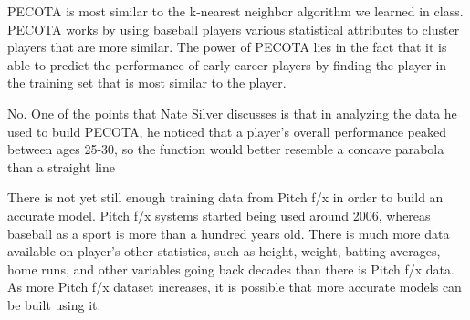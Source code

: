 \documentclass[12pt]{article}
\begin{document}

\begin{enumerate}


PECOTA is most similar to the k-nearest neighbor algorithm we learned in class. PECOTA works by using baseball players various statistical attributes to cluster players that are more similar. The power of PECOTA lies in the fact that it is able to predict the performance of early career players by finding the player in the training set that is most similar to the player.


No. One of the points that Nate Silver discusses is that in analyzing the data he used to build PECOTA, he noticed that a player's overall performance peaked between ages 25-30, so the function would better resemble a concave parabola than a straight line





There is not yet still enough training data from Pitch f/x in order to build an accurate model. Pitch f/x systems started being used around 2006, whereas baseball as a sport is more than a hundred years old. There is much more data available on player's other statistics, such as height, weight, batting averages, home runs, and other variables going back decades than there is Pitch f/x data. As more Pitch f/x dataset increases, it is possible that more accurate models can be built using it.




\end{enumerate}
\end{document}
